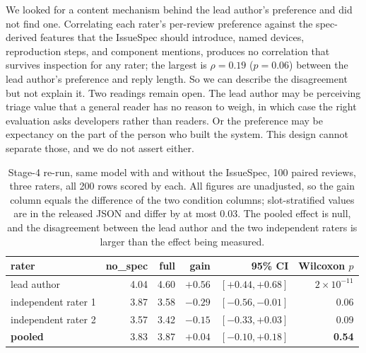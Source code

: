 \documentclass[sigconf, anonymous]{acmart}
\begin{document}
We looked for a content mechanism behind the lead author's preference and did not find one.
Correlating each rater's per-review preference against the spec-derived features that the
IssueSpec should introduce, named devices, reproduction steps, and component mentions, produces
no correlation that survives inspection for any rater; the largest is $\rho = 0.19$ ($p = 0.06$)
between the lead author's preference and reply length. So we can describe the disagreement but
not explain it. Two readings remain open. The lead author may be perceiving triage value that a
general reader has no reason to weigh, in which case the right evaluation asks developers rather
than readers. Or the preference may be expectancy on the part of the person who built the system.
This design cannot separate those, and we do not assert either.

\begin{table}[t]\centering\footnotesize
\caption{Stage-4 re-run, same model with and without the IssueSpec, 100 paired reviews, three
raters, all 200 rows scored by each. All figures are unadjusted, so the gain column equals the difference of the two condition
columns; slot-stratified values are in the released JSON and differ by at most 0.03. The pooled
effect is null, and the disagreement between the lead author and the two independent raters is
larger than the effect being measured.}\label{tab:stage4-rerun}
\begin{tabular}{@{}lrrrrr@{}}\toprule
rater & no\_spec & full & gain & 95\% CI & Wilcoxon $p$ \\\midrule
lead author & 4.04 & 4.60 & $+0.56$ & $[+0.44, +0.68]$ & $2 \times 10^{-11}$ \\
independent rater 1 & 3.87 & 3.58 & $-0.29$ & $[-0.56, -0.01]$ & 0.06 \\
independent rater 2 & 3.57 & 3.42 & $-0.15$ & $[-0.33, +0.03]$ & 0.09 \\\midrule
\textbf{pooled} & 3.83 & 3.87 & $\mathbf{+0.04}$ & $[-0.10, +0.18]$ & \textbf{0.54} \\
\bottomrule\end{tabular}\end{table}
\end{document}
